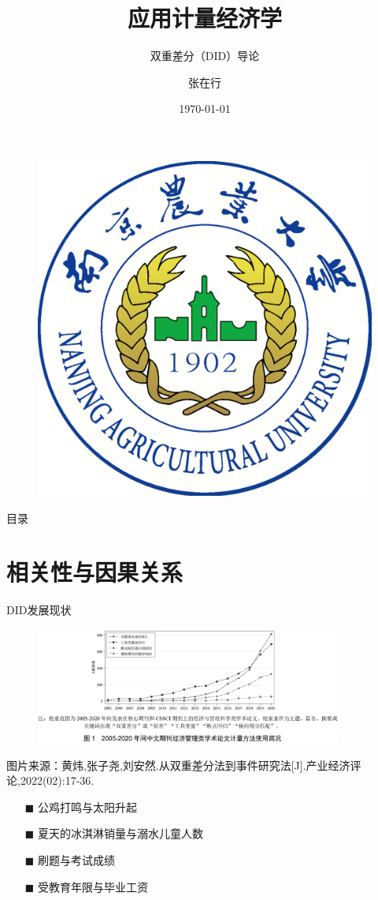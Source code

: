 \documentclass[aspectratio=169]{beamer}
\author{张在行}
\title{应用计量经济学}
\subtitle{双重差分（DID）导论}
\institute{南京农业大学经济管理学院}
\date{\today}
\begin{document}
\begin{frame}
    \kaishu
    \titlepage
    \begin{figure}[htpb]
        \centering
        \includegraphics[width=0.1\linewidth]{pic/NJAU.eps}
    \end{figure}
\end{frame}

\begin{frame}{目录}
    \tableofcontents[sectionstyle=show,subsectionstyle=show/shaded/hide,subsubsectionstyle=show/shaded/hide]
\end{frame}

\linespread{1.5} %
\section{相关性与因果关系}

\begin{frame}{DID发展现状}
    \begin{figure}
        \centering
        \includegraphics[width=0.9\textwidth]{01}
    \end{figure}
    \begin{center}
        \scriptsize 图片来源：黄炜,张子尧,刘安然.从双重差分法到事件研究法[J].产业经济评论,2022(02):17-36.
    \end{center}
\end{frame}

\begin{frame}
    \begin{itemize}
        \item[$\blacksquare$] 公鸡打鸣与太阳升起
        \item[$\blacksquare$] 夏天的冰淇淋销量与溺水儿童人数
        \item[$\blacksquare$] 刷题与考试成绩
        \item[$\blacksquare$] 受教育年限与毕业工资
    \end{itemize}
\end{frame}
\end{document}
